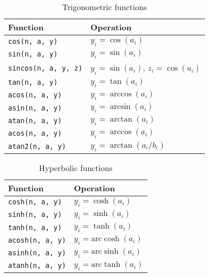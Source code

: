 \begin{table}
  \begin{tabularx}{\textwidth}{LL}
    \toprule
    Function & Operation \\
    \midrule
    \texttt{cos(n, a, y)}       & $y_i = \cos(a_i)$                    \\
    \texttt{sin(n, a, y)}       & $y_i = \sin(a_i)$                    \\
    \texttt{sincos(n, a, y, z)} & $y_i = \sin(a_i)$, $z_i = \cos(a_i)$ \\
    \texttt{tan(n, a, y)}       & $y_i = \tan(a_i)$                    \\
    \texttt{acos(n, a, y)}      & $y_i = \arccos(a_i)$                 \\
    \texttt{asin(n, a, y)}      & $y_i = \arcsin(a_i)$                 \\
    \texttt{atan(n, a, y)}      & $y_i = \arctan(a_i)$                 \\
    \texttt{acos(n, a, y)}      & $y_i = \arccos(a_i)$                 \\
    \texttt{atan2(n, a, y)}     & $y_i = \arctan(a_i / b_i)$           \\
    \bottomrule
  \end{tabularx}
  \caption{Trigonometric functions}
  \label{tab:Trigonometric functions}
\end{table}

\begin{table}
  \begin{tabularx}{\textwidth}{LL}
    \toprule
    Function & Operation \\
    \midrule
    \texttt{cosh(n, a, y)}  & $y_i = \cosh(a_i)$             \\
    \texttt{sinh(n, a, y)}  & $y_i = \sinh(a_i)$             \\
    \texttt{tanh(n, a, y)}  & $y_i = \tanh(a_i)$             \\
    \texttt{acosh(n, a, y)} & $y_i = \mathrm{arc}\cosh(a_i)$ \\
    \texttt{asinh(n, a, y)} & $y_i = \mathrm{arc}\sinh(a_i)$ \\
    \texttt{atanh(n, a, y)} & $y_i = \mathrm{arc}\tanh(a_i)$ \\
    \bottomrule
  \end{tabularx}
  \caption{Hyperbolic functions}
  \label{tab:Hyperbolic functions}
\end{table}

